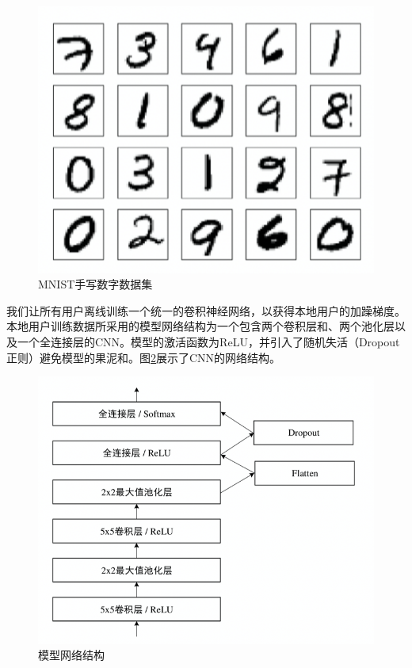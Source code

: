 \begin{figure}[!hbt]
\centering
	\includegraphics[scale=0.6]{fig2/C3/MNIST}%
	\caption{MNIST手写数字数据集}
	\label{fig:MNIST手写数字数据集}	
\end{figure}

我们让所有用户离线训练一个统一的卷积神经网络，以获得本地用户的加躁梯度。本地用户训练数据所采用的模型网络结构为一个包含两个卷积层和、两个池化层以及一个全连接层的CNN。模型的激活函数为ReLU，并引入了随机失活（Dropout正则）避免模型的果泥和。图\ref{fig:CNN模型网络结构}展示了CNN的网络结构。

\begin{figure}[!hbt]
\centering
	\includegraphics[scale=0.6]{fig2/C3/CNN网络结构}%
	\caption{模型网络结构}
	\label{fig:CNN模型网络结构}	
\end{figure}

